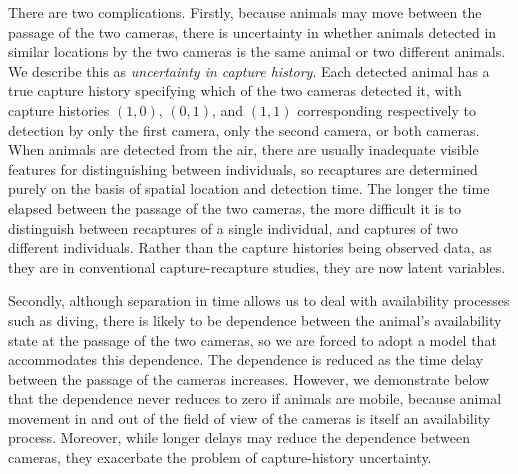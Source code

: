 \documentclass[useAMS, usenatbib, referee]{biom}\usepackage[]{graphicx}\usepackage[]{color}
\begin{document}
There are two complications. Firstly, because animals may move between the passage of the two cameras, there is uncertainty in whether animals detected in similar locations by the two cameras is the same animal or two different animals. We describe this as {\em uncertainty in capture history}. Each detected animal has a true capture history specifying which of the two cameras detected it, with capture histories $(1, 0)$, $(0, 1)$, and $(1, 1)$ corresponding respectively to detection by only the first camera, only the second camera, or both cameras. When animals are detected from the air, there are usually inadequate visible features for distinguishing between individuals, so recaptures are determined purely on the basis of spatial location and detection time. The longer the time elapsed between the passage of the two cameras, the more difficult it is to distinguish between recaptures of a single individual, and captures of two different individuals. Rather than the capture histories being observed data, as they are in conventional capture-recapture studies, they are now latent variables.

Secondly, although separation in time allows us to deal with availability processes such as diving, there is likely to be dependence between the animal's availability state at the passage of the two cameras, so we are forced to adopt a model that accommodates this dependence. The dependence is reduced as the time delay between the passage of the cameras increases. However, we demonstrate below that the dependence never reduces to zero if animals are mobile, because animal movement in and out of the field of view of the cameras is itself an availability process. Moreover, while longer delays may reduce the dependence between cameras, they exacerbate the problem of capture-history uncertainty.

\end{document}
